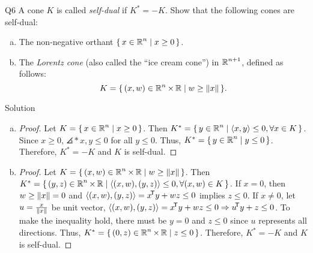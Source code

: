\documentclass{article}
\begin{document}
\begin{problem}
    {Q6}
    A cone $K$ is called \textit{self-dual} if $K^*=-K$. Show that the following cones are self-dual:
    \begin{enumerate}[(a)]
        \item The non-negative orthant $\set{x\in\R^n\mid x\geq 0}$.
        \item The \textit{Lorentz cone} (also called the ``ice cream cone'') in $\R^{n+1}$, defined as follows: \[K=\set{(x,w)\in \R^n\times\R\mid w\geq\norm{x}}.\]
    \end{enumerate}
\end{problem}

\begin{solution}
    {Solution}
    \begin{enumerate}[(a)]
        \item {
            \begin{proof}
                Let $K=\set{x\in\R^n\mid x\geq 0}$. Then $K^*=\set{y\in\R^n\mid \angles*{x,y}\leq 0, \forall x\in K}$. Since $x\geq 0$, $\angles*{x,y}\leq 0$ for all $y\leq 0$. Thus, $K^*=\set{y\in\R^n\mid y\leq 0}$. Therefore, $K^*=-K$ and $K$ is self-dual.
            \end{proof}
        }
        \item {
            \begin{proof}
                Let $K=\set{(x,w)\in \R^n\times\R\mid w\geq\norm{x}}$. Then $K^*=\set{(y,z)\in \R^n\times\R\mid \angles*{(x,w),(y,z)}\leq 0, \forall (x,w)\in K}$. If $x=0$, then $w\geq \norm{x}=0$ and $\angles*{(x,w),(y,z)} = x\trn y+wz \leq 0$ implies $z\leq 0$. If $x\neq 0$, let $u=\frac{x}{\norm{x}}$ be unit vector, $\angles*{(x,w),(y,z)} = x\trn y+wz \leq 0 \Rightarrow u\trn y+z\leq 0$. To make the inequality hold, there must be $y=0$ and $z\leq 0$ since $u$ represents all directions. Thus, $K^*=\set{(0,z)\in \R^n\times\R\mid z\leq 0}$. Therefore, $K^*=-K$ and $K$ is self-dual.
            \end{proof}
        }
    \end{enumerate}
\end{solution}
\end{document}
